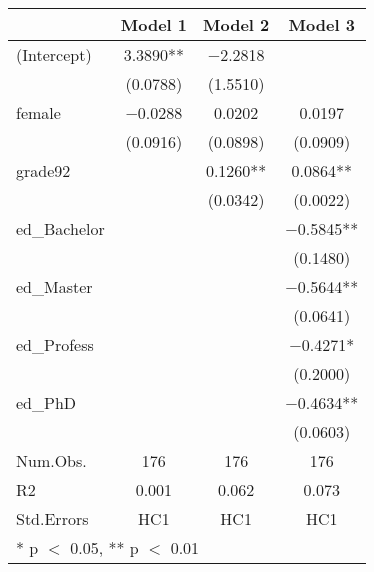 \documentclass[
]{article}
\begin{document}
\begin{table}

\caption{\label{tab:unnamed-chunk-6}}
\centering
\begin{tabular}[t]{lccc}
\toprule
  & Model 1 & Model 2 & Model 3\\
\midrule
(Intercept) & \num{3.3890}** & \num{-2.2818} & \\
 & (\num{0.0788}) & (\num{1.5510}) & \\
female & \num{-0.0288} & \num{0.0202} & \num{0.0197}\\
 & (\num{0.0916}) & (\num{0.0898}) & (\num{0.0909})\\
grade92 &  & \num{0.1260}** & \num{0.0864}**\\
 &  & (\num{0.0342}) & (\num{0.0022})\\
ed\_Bachelor &  &  & \num{-0.5845}**\\
 &  &  & (\num{0.1480})\\
ed\_Master &  &  & \num{-0.5644}**\\
 &  &  & (\num{0.0641})\\
ed\_Profess &  &  & \num{-0.4271}*\\
 &  &  & (\num{0.2000})\\
ed\_PhD &  &  & \num{-0.4634}**\\
 &  &  & (\num{0.0603})\\
\midrule
Num.Obs. & \num{176} & \num{176} & \num{176}\\
R2 & \num{0.001} & \num{0.062} & \num{0.073}\\
Std.Errors & HC1 & HC1 & HC1\\
\bottomrule
\multicolumn{4}{l}{\rule{0pt}{1em}* p $<$ 0.05, ** p $<$ 0.01}\\
\end{tabular}
\end{table}
\end{document}
